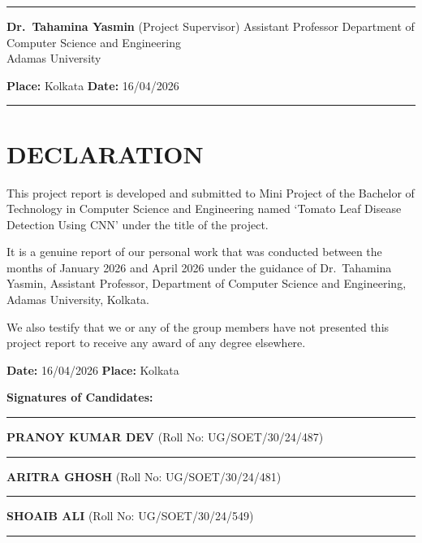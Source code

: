 \documentclass[
]{article}
\begin{document}
\begin{center}\rule{0.5\linewidth}{0.5pt}\end{center}

\textbf{Dr.~Tahamina Yasmin} (Project Supervisor) Assistant Professor
Department of Computer Science and Engineering\\
Adamas University

\textbf{Place:} Kolkata \textbf{Date:} 16/04/2026

\begin{center}\rule{0.5\linewidth}{0.5pt}\end{center}

\section{DECLARATION}\label{declaration}

This project report is developed and submitted to Mini Project of the
Bachelor of Technology in Computer Science and Engineering named `Tomato
Leaf Disease Detection Using CNN' under the title of the project.

It is a genuine report of our personal work that was conducted between
the months of January 2026 and April 2026 under the guidance of
Dr.~Tahamina Yasmin, Assistant Professor, Department of Computer Science
and Engineering, Adamas University, Kolkata.

We also testify that we or any of the group members have not presented
this project report to receive any award of any degree elsewhere.

\textbf{Date:} 16/04/2026 \textbf{Place:} Kolkata

\textbf{Signatures of Candidates:}

\begin{center}\rule{0.5\linewidth}{0.5pt}\end{center}

\textbf{PRANOY KUMAR DEV} (Roll No: UG/SOET/30/24/487)

\begin{center}\rule{0.5\linewidth}{0.5pt}\end{center}

\textbf{ARITRA GHOSH} (Roll No: UG/SOET/30/24/481)

\begin{center}\rule{0.5\linewidth}{0.5pt}\end{center}

\textbf{SHOAIB ALI} (Roll No: UG/SOET/30/24/549)

\begin{center}\rule{0.5\linewidth}{0.5pt}\end{center}
\end{document}
